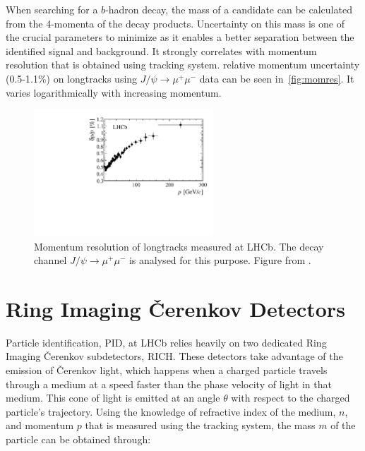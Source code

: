 When searching for a $b$-hadron decay, the mass of a candidate can be calculated from the 4-momenta of the decay products. Uncertainty on this mass is one of the crucial parameters to minimize as it enables a better separation between the identified signal and background. It strongly correlates with \DIFaddbegin {}\DIFaddend momentum resolution that is obtained using \DIFaddbegin {}\DIFaddend tracking system. \DIFdelbegin {}\DIFdelend \DIFaddbegin {}\DIFaddend relative momentum uncertainty (0.5-1.1\%) on \gls{longtrack}s using $J/\psi \rightarrow \mu^{+} \mu^{-}$ data can be seen in~\autoref{fig:momres}. It varies logarithmically with increasing momentum.


\begin{figure}[!h]
	\centering
	\includegraphics[width = 0.6\textwidth]{figs/detector/Fig17.pdf}
	\caption{Momentum resolution of \gls{longtrack}s measured at \gls{LHCb}. The decay channel $J/\psi \rightarrow \mu^{+} \mu^{-}$ is analysed for this purpose. Figure from \cite{LHCb-DP-2014-002}.}
	\label{fig:momres}
\end{figure}

\section{Ring Imaging \v{C}erenkov Detectors}
\label{richsec}
Particle identification, \Gls{PID}, at \Gls{LHCb} relies heavily on two dedicated Ring Imaging \v{C}erenkov subdetectors, \gls{RICH}. These detectors take advantage of the emission of \v{C}erenkov light, which happens when a charged particle travels through a medium at a speed faster than the phase velocity of light in that medium. This cone of light is emitted at an angle $\theta$ with respect to the charged particle's trajectory. Using the knowledge of \DIFaddbegin {}\DIFaddend refractive index of the medium, $n$, and momentum $p$ that is measured using the tracking system, the mass $m$ of the particle can be obtained through:

